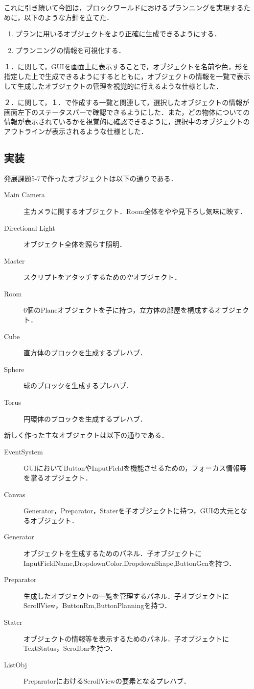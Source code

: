 \documentclass[12pt]{jarticle}
\begin{document}
これに引き続いて今回は，ブロックワールドにおけるプランニングを実現するために，以下のような方針を立てた．
\begin{enumerate}
\item プランに用いるオブジェクトをより正確に生成できるようにする．
\item プランニングの情報を可視化する．
\end{enumerate}

１．に関して，GUIを画面上に表示することで，オブジェクトを名前や色，形を指定した上で生成できるようにするとともに，オブジェクトの情報を一覧で表示して生成したオブジェクトの管理を視覚的に行えるような仕様とした．

２．に関して，１．で作成する一覧と関連して，選択したオブジェクトの情報が画面左下のステータスバーで確認できるようにした．また，どの物体についての情報が表示されているかを視覚的に確認できるように，選択中のオブジェクトのアウトラインが表示されるような仕様とした．

\subsection{実装}
発展課題5-7で作ったオブジェクトは以下の通りである．
\begin{description}
\item[Main Camera] 主カメラに関するオブジェクト．Room全体をやや見下ろし気味に映す．
\item[Directional Light] オブジェクト全体を照らす照明．
\item[Master] スクリプトをアタッチするための空オブジェクト．
\item[Room] 6個のPlaneオブジェクトを子に持つ，立方体の部屋を構成するオブジェクト．
\item[Cube] 直方体のブロックを生成するプレハブ．
\item[Sphere] 球のブロックを生成するプレハブ．
\item[Torus] 円環体のブロックを生成するプレハブ．
\end{description} 

新しく作った主なオブジェクトは以下の通りである．
\begin{description}
\item[EventSystem] GUIにおいてButtonやInputFieldを機能させるための，フォーカス情報等を掌るオブジェクト．
\item[Canvas] Generator，Preparator，Staterを子オブジェクトに持つ，GUIの大元となるオブジェクト．
\item[Generator] オブジェクトを生成するためのパネル．子オブジェクトにInputFieldName,DropdownColor,DropdownShape,ButtonGenを持つ．
\item[Preparator] 生成したオブジェクトの一覧を管理するパネル．子オブジェクトにScrollView，ButtonRm,ButtonPlanningを持つ．
\item[Stater] オブジェクトの情報等を表示するためのパネル．子オブジェクトにTextStatus，Scrollbarを持つ．
\item[ListObj] PreparatorにおけるScrollViewの要素となるプレハブ．
\end{description} 
\end{document}
